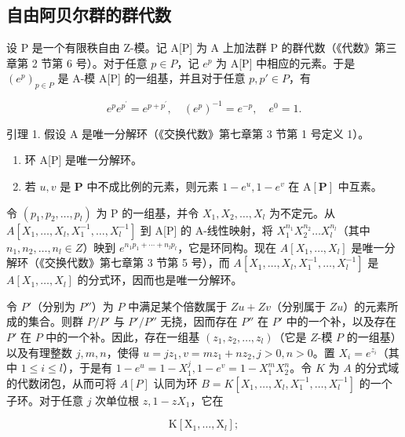 \subsection{自由阿贝尔群的群代数}

设 P 是一个有限秩自由 Z-模。记 A{[}P{]} 为 A 上加法群 P 的群代数（《代数》第三章第 2 节第 6 号）。对于任意 \(p \in P\)，记 \(e^{p}\) 为 A{[}P{]} 中相应的元素。于是 \((e^{p})_{p \in P}\) 是 A-模 A{[}P{]} 的一组基，并且对于任意 \(p, p' \in P\)，有

\[
e ^ {p} e ^ {p ^ {\prime}} = e ^ {p + p ^ {\prime}}, \quad (e ^ {p}) ^ {- 1} = e ^ {- p}, \quad e ^ {0} = 1.
\]

引理 1. 假设 A 是唯一分解环（《交换代数》第七章第 3 节第 1 号定义 1）。

\begin{enumerate}
\def\labelenumi{(\roman{enumi})}
\item
  环 A{[}P{]} 是唯一分解环。
\item
  若 \(u, v\) 是 \(\mathbf{P}\) 中不成比例的元素，则元素 \(1 - e^u, 1 - e^v\) 在 \(\mathrm{A}[\mathbf{P}]\) 中互素。
\end{enumerate}

令 \((p_{1}, p_{2}, \ldots, p_{l})\) 为 P 的一组基，并令 \(X_{1}, X_{2}, \ldots, X_{l}\) 为不定元。从 \(A[X_{1}, \ldots, X_{l}, X_{1}^{-1}, \ldots, X_{l}^{-1}]\) 到 A{[}P{]} 的 A-线性映射，将 \(X_{1}^{n_{1}} X_{2}^{n_{2}} \ldots X_{l}^{n_{l}}\)（其中 \(n_{1}, n_{2}, \ldots, n_{l} \in Z\)）映到 \(e^{n_{1} p_{1} + \cdots + n_{l} p_{l}}\)，它是环同构。现在 \(A[X_{1}, \ldots, X_{l}]\) 是唯一分解环（《交换代数》第七章第 3 节第 5 号），而 \(A[X_{1}, \ldots, X_{l}, X_{1}^{-1}, \ldots, X_{l}^{-1}]\) 是 \(A[X_{1}, \ldots, X_{l}]\) 的分式环，因而也是唯一分解环。

令 \(P'\)（分别为 \(P''\)）为 \(P\) 中满足某个倍数属于 \(Zu + Zv\)（分别属于 \(Zu\)）的元素所成的集合。则群 \(P/P'\) 与 \(P'/P''\) 无挠，因而存在 \(P''\) 在 \(P'\) 中的一个补，以及存在 \(P'\) 在 \(P\) 中的一个补。因此，存在一组基 \((z_1, z_2, \ldots, z_l)\)（它是 \(Z\)-模 \(P\) 的一组基）以及有理整数 \(j, m, n\)，使得 \(u = jz_1, v = mz_1 + nz_2, j > 0, n > 0\)。置 \(X_i = e^{z_i}\)（其中 \(1 \leqslant i \leqslant l\)），于是有 \(1 - e^u = 1 - X_1^j, 1 - e^v = 1 - X_1^m X_2^n\)。令 \(K\) 为 \(A\) 的分式域的代数闭包，从而可将 \(A[P]\) 认同为环 \(B = K[X_1, \ldots, X_l, X_1^{-1}, \ldots, X_l^{-1}]\) 的一个子环。对于任意 \(j\) 次单位根 \(z, 1 - zX_1\)，它在

\[
\mathrm{K} \left[ \mathrm{X} _ {1}, \dots , \mathrm{X} _ {l} \right];
\]

